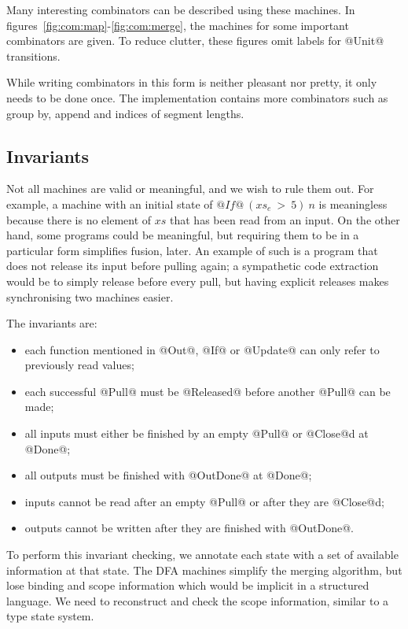 Many interesting combinators can be described using these machines.
In figures~\ref{fig:com:map}-\ref{fig:com:merge}, the machines for some important combinators are given.
To reduce clutter, these figures omit labels for @Unit@ transitions.

While writing combinators in this form is neither pleasant nor pretty, it only needs to be done once.
The implementation contains more combinators such as group by, append and indices of segment lengths.





\subsection{Invariants}
\label{s:Machines:Invariants}
Not all machines are valid or meaningful, and we wish to rule them out.
For example, a machine with an initial state of $@If@~(xs_e~>~5)~n$ is meaningless because there is no element of $xs$ that has been read from an input. 
On the other hand, some programs could be meaningful, but requiring them to be in a particular form simplifies fusion, later.
An example of such is a program that does not release its input before pulling again; a sympathetic code extraction would be to simply release before every pull, but having explicit releases makes synchronising two machines easier.

The invariants are:
\begin{itemize}
\item each function mentioned in @Out@, @If@ or @Update@ can only refer to previously read values;
\item each successful @Pull@ must be @Released@ before another @Pull@ can be made;
\item all inputs must either be finished by an empty @Pull@ or @Close@d at @Done@;
\item all outputs must be finished with @OutDone@ at @Done@;
\item inputs cannot be read after an empty @Pull@ or after they are @Close@d;
\item outputs cannot be written after they are finished with @OutDone@.
\end{itemize}

To perform this invariant checking, we annotate each state with a set of available information at that state.
The DFA machines simplify the merging algorithm, but lose binding and scope information which would be implicit in a structured language.
We need to reconstruct and check the scope information, similar to a type state system\CITE.

